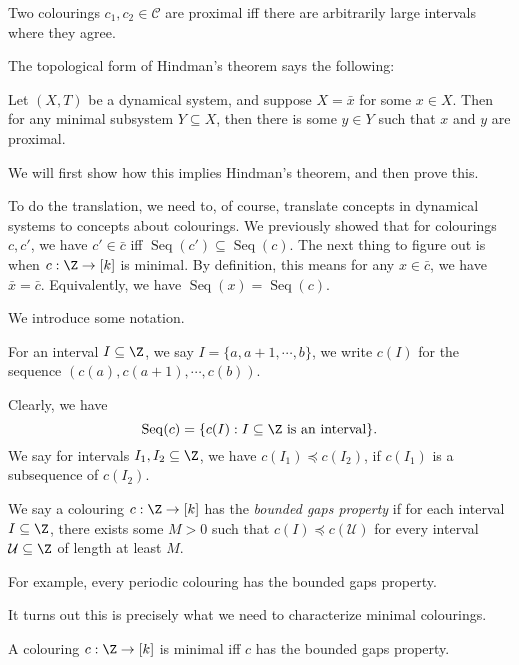 \documentclass[a4paper]{article}
\DeclareMathOperator\Seq{Seq}
\begin{document}
\begin{eg}
  Two colourings $c_1, c_2 \in \mathcal{C}$ are proximal iff there are arbitrarily large intervals where they agree.
\end{eg}

The topological form of Hindman's theorem says the following:
\begin{thm}
  Let $(X, T)$ be a dynamical system, and suppose $X = \bar{x}$ for some $x \in X$. Then for any minimal subsystem $Y \subseteq X$, then there is some $y \in Y$ such that $x$ and $y$ are proximal.
\end{thm}
We will first show how this implies Hindman's theorem, and then prove this.

To do the translation, we need to, of course, translate concepts in dynamical systems to concepts about colourings. We previously showed that for colourings $c, c'$, we have $c' \in \bar{c}$ iff $\Seq(c') \subseteq \Seq(c)$. The next thing to figure out is when $c: \Z \to [k]$ is minimal. By definition, this means for any $x \in \bar{c}$, we have $\bar{x} = \bar{c}$. Equivalently, we have $\Seq(x) = \Seq(c)$.

We introduce some notation.
\begin{notation}
  For an interval $I \subseteq \Z$, we say $I = \{a, a + 1, \cdots, b\}$, we write $c(I)$ for the sequence $(c(a), c(a + 1), \cdots, c(b))$.
\end{notation}
Clearly, we have
\[
  \Seq(c) = \{c(I): I \subseteq \Z\text{ is an interval}\}.
\]
We say for intervals $I_1, I_2 \subseteq \Z$, we have $c(I_1) \preccurlyeq c(I_2)$, if $c(I_1)$ is a subsequence of $c(I_2)$.

\begin{defi}
  We say a colouring $c: \Z \to [k]$ has the \emph{bounded gaps property} if for each interval $I \subseteq \Z$, there exists some $M > 0$ such that $c(I) \preccurlyeq c(\mathcal{U})$ for every interval $\mathcal{U} \subseteq \Z$ of length at least $M$.
\end{defi}
For example, every periodic colouring has the bounded gaps property.

It turns out this is precisely what we need to characterize minimal colourings.

\begin{prop}
  A colouring $c: \Z \to [k]$ is minimal iff $c$ has the bounded gaps property.
\end{prop}
\end{document}
